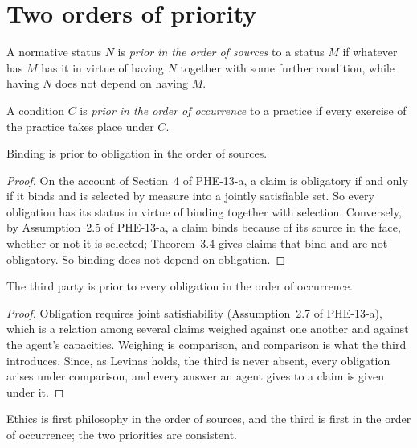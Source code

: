 \documentclass{situationist-preprint}
\begin{document}
\section{Two orders of priority}

\begin{definition}\label{d:source}
A normative status $N$ is \emph{prior in the order of sources} to a status $M$ if whatever has $M$ has it in virtue of having $N$ together with some further condition, while having $N$ does not depend on having $M$.
\end{definition}

\begin{definition}\label{d:occurrence}
A condition $C$ is \emph{prior in the order of occurrence} to a practice if every exercise of the practice takes place under $C$.
\end{definition}

\begin{proposition}\label{p:ethics}
Binding is prior to obligation in the order of sources.
\end{proposition}

\begin{proof}
On the account of Section~4 of PHE-13-a, a claim is obligatory if and only if it binds and is selected by measure into a jointly satisfiable set. So every obligation has its status in virtue of binding together with selection. Conversely, by Assumption~2.5 of PHE-13-a, a claim binds because of its source in the face, whether or not it is selected; Theorem~3.4 gives claims that bind and are not obligatory. So binding does not depend on obligation.
\end{proof}

\begin{proposition}\label{p:third}
The third party is prior to every obligation in the order of occurrence.
\end{proposition}

\begin{proof}
Obligation requires joint satisfiability (Assumption~2.7 of PHE-13-a), which is a relation among several claims weighed against one another and against the agent's capacities. Weighing is comparison, and comparison is what the third introduces. Since, as Levinas holds, the third is never absent, every obligation arises under comparison, and every answer an agent gives to a claim is given under it.
\end{proof}

\begin{theorem}\label{t:consistent}
Ethics is first philosophy in the order of sources, and the third is first in the order of occurrence; the two priorities are consistent.
\end{theorem}
\end{document}
